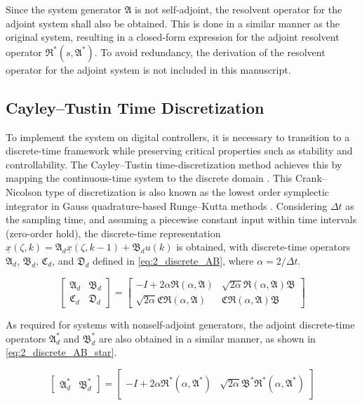 Since the system generator $\mathfrak{A}$ is not self-adjoint, the resolvent operator for the adjoint system shall also be obtained. This is done in a similar manner as the original system, resulting in a closed-form expression for the adjoint resolvent operator $\mathfrak{R}^*(s, \mathfrak{A}^*)$. %
To avoid redundancy, the derivation of the resolvent operator for the adjoint system is not included in this manuscript.

\subsection{Cayley–Tustin Time Discretization}

To implement the system on digital controllers, it is necessary to transition to a discrete-time framework while preserving critical properties such as stability and controllability. The Cayley–Tustin time-discretization method achieves this by mapping the continuous-time system to the discrete domain \cite{havu2007cayley, xu2017linear}. This Crank–Nicolson type of discretization is also known as the lowest order symplectic integrator in Gauss quadrature-based Runge–Kutta methods \cite{hairer2006geometric}. Considering $\Delta t$ as the sampling time, and assuming a piecewise constant input within time intervals (zero-order hold), the discrete-time representation $\underline{x}(\zeta, k) = \mathfrak{A}_d \underline{x}(\zeta, k-1) + \mathfrak{B}_d u(k)$ is obtained, with discrete-time operators $\mathfrak{A}_d$, $\mathfrak{B}_d$, $\mathfrak{C}_d$, and $\mathfrak{D}_d$ defined in \eqref{eq:2_discrete_AB}, where $\alpha = 2/{\Delta t}$.

\begin{equation} \label{eq:2_discrete_AB}
    \begin{bmatrix}
        \mathfrak{A}_d & \mathfrak{B}_d \\
        \mathfrak{C}_d & \mathfrak{D}_d
    \end{bmatrix} = 
    \begin{bmatrix}
        -I + 2\alpha \mathfrak{R}(\alpha, \mathfrak{A}) & \sqrt{2\alpha} \mathfrak{R}(\alpha, \mathfrak{A}) \mathfrak{B} \\
        \sqrt{2\alpha} \mathfrak{C} \mathfrak{R}(\alpha, \mathfrak{A}) & \mathfrak{C} \mathfrak{R}(\alpha, \mathfrak{A}) \mathfrak{B}
    \end{bmatrix}
\end{equation}

As required for systems with nonself-adjoint generators, the adjoint discrete-time operators $\mathfrak{A}_d^*$ and $\mathfrak{B}_d^*$ are also obtained in a similar manner, as shown in \eqref{eq:2_discrete_AB_star}.

\begin{equation} \label{eq:2_discrete_AB_star}
    \begin{bmatrix}
        \mathfrak{A}_d^* & \mathfrak{B}_d^*
    \end{bmatrix} = 
    \begin{bmatrix}
        -I + 2\alpha \mathfrak{R}^*(\alpha, \mathfrak{A}^*) & \sqrt{2\alpha} \mathfrak{B}^* \mathfrak{R}^*(\alpha, \mathfrak{A}^*)
    \end{bmatrix}
\end{equation}

